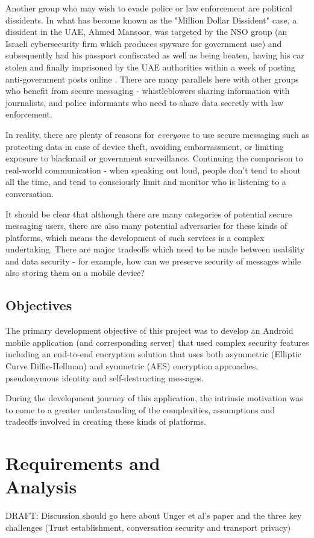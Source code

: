 \documentclass{mproj}
\begin{document}
Another group who may wish to evade police or law enforcement are political dissidents. In what has become known as the "Million Dollar Dissident" \cite{marczak2018hide} case, a dissident in the UAE, Ahmed Mansoor, was targeted by the NSO group (an Israeli cybersecurity firm which produces spyware for government use) and subsequently had his passport confiscated as well as being beaten, having his car stolen and finally imprisoned by the UAE authorities within a week of posting anti-government posts online \cite{mazzetti2019new}. There are many parallels here with other groups who benefit from secure messaging - whistleblowers sharing information with journalists, and police informants who need to share data secretly with law enforcement. 

In reality, there are plenty of reasons for \emph{everyone} to use secure messaging such as protecting data in case of device theft, avoiding embarrassment, or limiting exposure to blackmail or government surveillance. Continuing the comparison to real-world communication - when speaking out loud, people don't tend to shout all the time, and tend to consciously limit and monitor who is listening to a conversation.

It should be clear that although there are many categories of potential secure messaging users, there are also many potential adversaries for these kinds of platforms, which means the development of such services is a complex undertaking. There are major tradeoffs which need to be made between usability and data security - for example, how can we preserve security of messages while also storing them on a mobile device? 

\section{Objectives}
The primary development objective of this project was to develop an Android mobile application (and corresponding server) that used complex security features including an end-to-end encryption solution that uses both asymmetric (Elliptic Curve Diffie-Hellman) and symmetric (AES) encryption approaches, pseudonymous identity and self-destructing messages. 

During the development journey of this application, the intrinsic motivation was to come to a greater understanding of the complexities, assumptions and tradeoffs involved in creating these kinds of platforms. 

\chapter{Requirements and \\ Analysis}\label{analysis}
DRAFT: Discussion should go here about Unger et al's paper and the three key challenges (Trust establishment, conversation security and transport privacy)\cite{unger2015sok}
\end{document}

